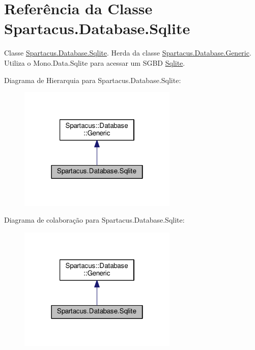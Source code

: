 \hypertarget{classSpartacus_1_1Database_1_1Sqlite}{\section{Referência da Classe Spartacus.\+Database.\+Sqlite}
\label{classSpartacus_1_1Database_1_1Sqlite}
}


Classe \hyperlink{classSpartacus_1_1Database_1_1Sqlite}{Spartacus.\+Database.\+Sqlite}. Herda da classe \hyperlink{classSpartacus_1_1Database_1_1Generic}{Spartacus.\+Database.\+Generic}. Utiliza o Mono.\+Data.\+Sqlite para acessar um S\+G\+B\+D \hyperlink{classSpartacus_1_1Database_1_1Sqlite}{Sqlite}.  




Diagrama de Hierarquia para Spartacus.\+Database.\+Sqlite\+:\nopagebreak
\begin{figure}[H]
\begin{center}
\leavevmode
\includegraphics[width=214pt]{classSpartacus_1_1Database_1_1Sqlite__inherit__graph}
\end{center}
\end{figure}


Diagrama de colaboração para Spartacus.\+Database.\+Sqlite\+:\nopagebreak
\begin{figure}[H]
\begin{center}
\leavevmode
\includegraphics[width=214pt]{classSpartacus_1_1Database_1_1Sqlite__coll__graph}
\end{center}
\end{figure}
